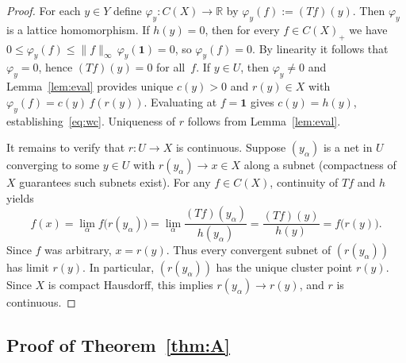 \documentclass[11pt]{amsart}
\renewcommand{\le}{\leqslant}
\numberwithin{equation}{section}
\theoremstyle{definition}
\theoremstyle{remark}
\theoremstyle{plain}
\begin{document}
\begin{proof}
For each $y\in Y$ define $\varphi_y\colon C(X)\to\mathbb R$ by $\varphi_y(f):=(Tf)(y)$.
Then $\varphi_y$ is a lattice homomorphism.
If $h(y)=0$, then for every $f\in C(X)_+$ we have
$0\le \varphi_y(f)\le \|f\|_\infty\,\varphi_y(\mathbf{1})=0$,
so $\varphi_y(f)=0$.
By linearity it follows that $\varphi_y=0$, hence $(Tf)(y)=0$ for all~$f$.
If $y\in U$, then $\varphi_y\ne 0$ and Lemma~\ref{lem:eval} provides
unique $c(y)>0$ and $r(y)\in X$ with $\varphi_y(f)=c(y)\,f(r(y))$.
Evaluating at $f=\mathbf{1}$ gives $c(y)=h(y)$, establishing~\eqref{eq:wc}.
Uniqueness of $r$ follows from Lemma~\ref{lem:eval}.

It remains to verify that $r\colon U\to X$ is continuous.
Suppose $(y_\alpha)$ is a net in $U$ converging to some $y\in U$
with $r(y_\alpha)\to x\in X$ along a subnet (compactness of~$X$ guarantees such subnets exist).
For any $f\in C(X)$, continuity of $Tf$ and $h$ yields
\[
f(x)
=\lim_\alpha f\bigl(r(y_\alpha)\bigr)
=\lim_\alpha \frac{(Tf)(y_\alpha)}{h(y_\alpha)}
=\frac{(Tf)(y)}{h(y)}
=f\bigl(r(y)\bigr).
\]
Since $f$ was arbitrary, $x=r(y)$.
Thus every convergent subnet of $(r(y_\alpha))$ has limit $r(y)$.
In particular, $(r(y_\alpha))$ has the unique cluster point $r(y)$.
Since $X$ is compact Hausdorff, this implies $r(y_\alpha)\to r(y)$,
and $r$ is continuous.
\end{proof}

\subsection{Proof of Theorem~\ref{thm:A}}
\end{document}
